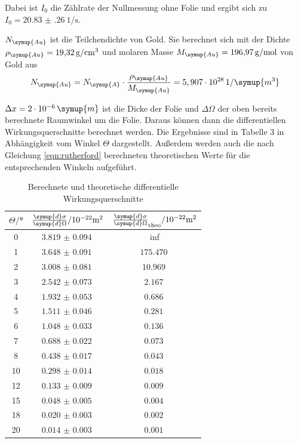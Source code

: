 Dabei ist $I_0$ die Zählrate der Nullmessung ohne Folie und ergibt sich zu $I_0 =\SI{20.83(26)}{1\per\second}$.

$N_\symup{Au}$ ist die Teilchendichte von Gold. Sie berechnet sich mit der Dichte
$\rho_\symup{Au} = \SI{19.32}{\gram\per\centi\meter^3}$ \cite{sample} und molaren Masse $M_\symup{Au} = \SI{196.97}{\gram\per\mol}$ \cite{sample}
von Gold aus
\begin{equation}
  N_\symup{Au} = N_\symup{A} \cdot \frac{\rho_\symup{Au}}{M_\symup{Au}} = 5,907 \cdot 10^{28} \, 1/\symup{m^3}
  \label{eqn:teilchendichte}
\end{equation}


$\Delta x = 2 \cdot 10^{-6} \, \symup{m}$ ist die Dicke der Folie und $\Delta \Omega$
der oben bereits berechnete Raumwinkel um die Folie. Daraus können dann die
differentiellen Wirkungsquerschnitte berechnet werden. Die Ergebnisse sind in Tabelle 3
in Abhängigkeit vom Winkel $\Theta$ dargestellt. Außerdem werden auch die nach
Gleichung \ref{eqn:rutherford} berechneten theoretischen Werte für die entsprechenden
Winkeln aufgeführt.


\begin{table}[H]
  \centering
  \caption{Berechnete und theoretische differentielle Wirkungsquerschnitte}
  \label{tab:Parameter}
  \begin{tabular}{c c c}
    \toprule
    $\Theta/$° & $\frac{\symup{d}\sigma}{\symup{d}\Omega}/ \mathrm{10^{-22}m^2}$ & $\frac{\symup{d}\sigma}{\symup{d}\Omega}_{\mathrm{theo}}/ \mathrm{10^{-22}m^2}$ \\
    \midrule
     0  &  $\SI{3.819(94)}{}$ & inf \\
     1  &  $\SI{3.648(91)}{}$ & $\SI{175.470}{}$ \\
     2  &  $\SI{3.008(81)}{}$ & $\SI{10.969}{}$ \\
     3  &  $\SI{2.542(73)}{}$ & $\SI{2.167}{}$ \\
     4  &  $\SI{1.932(53)}{}$ & $\SI{0.686}{}$ \\
     5  &  $\SI{1.511(46)}{}$ & $\SI{0.281}{}$ \\
     6  &  $\SI{1.048(33)}{}$ & $\SI{0.136}{}$ \\
     7  &  $\SI{0.688(22)}{}$ & $\SI{0.073}{}$\\
     8  &  $\SI{0.438(17)}{}$ & $\SI{0.043}{}$\\
    10  &  $\SI{0.298(14)}{}$ & $\SI{0.018}{}$\\
    12  &  $\SI{0.133(9)}{}$  & $\SI{0.009}{}$\\
    15  &  $\SI{0.048(5)}{}$  & $\SI{0.004}{}$\\
    18  &  $\SI{0.020(3)}{}$  & $\SI{0.002}{}$\\
    20  &  $\SI{0.014(3)}{}$  & $\SI{0.001}{}$\\
      \bottomrule
  \end{tabular}
\end{table}

